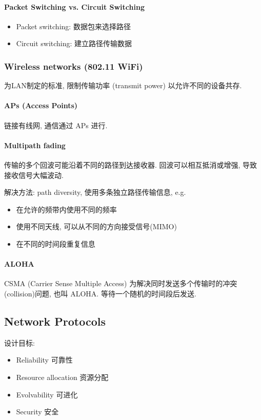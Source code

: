 \paragraph{Packet Switching vs. Circuit Switching} \quad
\begin{itemize}
    \item Packet switching: 数据包来选择路径
    \item Circuit switching: 建立路径传输数据
\end{itemize}

\subsubsection{Wireless networks (802.11 WiFi)}
为LAN制定的标准, 限制传输功率 (transmit power) 以允许不同的设备共存. 

\paragraph{APs (Access Points)} 链接有线网, 通信通过 APs 进行. 

\paragraph{Multipath fading} 传输的多个回波可能沿着不同的路径到达接收器. 回波可以相互抵消或增强, 导致接收信号大幅波动.

解决方法: path diversity, 使用多条独立路径传输信息, e.g. 
\begin{itemize}
    \item 在允许的频带内使用不同的频率
    \item 使用不同天线, 可以从不同的方向接受信号(MIMO)
    \item 在不同的时间段重复信息
\end{itemize}

\paragraph{ALOHA} CSMA (Carrier Sense Multiple Access) 为解决同时发送多个传输时的冲突(collision)问题, 也叫 ALOHA. 等待一个随机的时间段后发送. 

\subsection{Network Protocols}
设计目标:
\begin{itemize}
    \item Reliability 可靠性
    \item Resource allocation 资源分配
    \item Evolvability 可进化
    \item Security 安全
\end{itemize}

